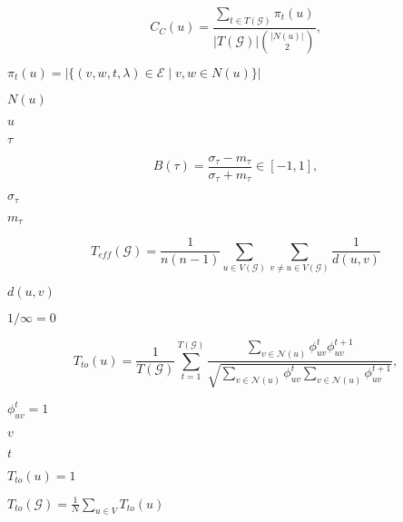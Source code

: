 \documentclass{article}
\begin{document}
\[ C_C(u) = \frac{\sum_{t\in T(\mathcal{G})} \pi_t(u)}{|T(\mathcal{G})|{|N(u)| \choose 2}}, \]
\pagebreak

$\pi_t(u)=|\{(v,w,t,\lambda)\in\mathcal{E}\mid v,w\in N(u)\}|$
\pagebreak

$N(u)$
\pagebreak

$u$
\pagebreak

$\tau$
\pagebreak

\[ B(\tau)=\frac{\sigma_\tau - m_\tau}{\sigma_\tau + m_\tau} \in [-1,1], \]
\pagebreak

$\sigma_\tau$
\pagebreak

$m_\tau$
\pagebreak

\[ T_{eff}(\mathcal{G})=\frac{1}{n(n-1)}\sum_{u\in V(\mathcal{G})}\sum_{v\neq u\in V(\mathcal{G})}\frac{1}{d(u,v)} \]
\pagebreak

$d(u,v)$
\pagebreak

$1/\infty=0$
\pagebreak

\[ T_{to}(u)=\frac{1}{T(\mathcal{G})}\sum_{t=1}^{T(\mathcal{G})}\frac{\sum_{v\in\mathcal{N}(u)}\phi^t_{uv}\phi^{t+1}_{uv}}{\sqrt{\sum_{v\in\mathcal{N}(u)}\phi^t_{uv}\sum_{v\in\mathcal{N}(u)}\phi^{t+1}_{uv}}}, \]
\pagebreak

$\phi^{t}_{uv}=1$
\pagebreak

$v$
\pagebreak

$t$
\pagebreak

$T_{to}(u)=1$
\pagebreak

$T_{to}(\mathcal{G})=\frac{1}{N}\sum_{u\in V}T_{to}(u)$
\pagebreak
\end{document}
